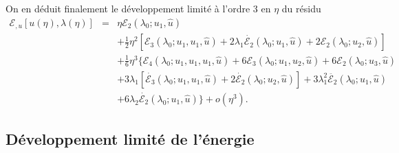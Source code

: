 \documentclass{article}
\newcommand{\nobracket}{}
\newcommand{\nosymbol}{}
\begin{document}
On en d{\'e}duit finalement le d{\'e}veloppement limit{\'e} {\`a} l'ordre 3 en
$\eta$ du r{\'e}sidu
\begin{eqnarray}
  \mathcal{E}_{, u} [u (\eta), \lambda (\eta)] & = & \eta \mathcal{E}_2
  (\lambda_0 ; u_1, \hat{u}) \nonumber\\
  &  & \nosymbol + \tfrac{1}{2} \eta^2  [\mathcal{E}_3 (\lambda_0 ; u_1, u_1,
  \hat{u}) + 2 \lambda_1  \dot{\mathcal{E}_2} (\lambda_0 ; u_1, \hat{u}) +
  2\mathcal{E}_2 (\lambda_0 ; u_2, \hat{u})] \nonumber\\
  &  & \nosymbol + \tfrac{1}{6} \eta^3  \{ \mathcal{E}_4 (\lambda_0 ; u_1,
  u_1, u_1, \hat{u}) + 6\mathcal{E}_3 (\lambda_0 ; u_1, u_2, \hat{u})
  \nobracket + 6\mathcal{E}_2 (\lambda_0 ; u_3, \hat{u}) \nonumber\\
  &  & \nosymbol + 3 \lambda_1  [\dot{\mathcal{E}_3} (\lambda_0 ; u_1, u_1,
  \hat{u}) + 2 \dot{\mathcal{E}_2} (\lambda_0 ; u_2, \hat{u})] + 3 \lambda_1^2
  \ddot{\mathcal{E}_2} (\lambda_0 ; u_1, \hat{u}) \nonumber\\
  &  & \nobracket \nosymbol + 6 \lambda_2  \dot{\mathcal{E}_2} (\lambda_0 ;
  u_1, \hat{u}) \} + o (\eta^3) .  \label{eq20220107080901}
\end{eqnarray}
\subsection{D{\'e}veloppement limit{\'e} de
l'{\'e}nergie}\label{sec20220121172919}
\end{document}
